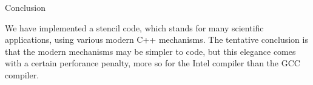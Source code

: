  {Conclusion}

We have implemented a stencil code, which stands for many scientific applications,
using various modern C++ mechanisms.
The tentative conclusion is that the modern mechanisms may be simpler to code,
but this elegance comes with a certain perforance penalty,
more so for the Intel compiler than the GCC compiler.

\endinput


First of all we remark that ranging over data:
\begin{multicols}{2}
\begin{lstlisting}
#pragma omp parallel for 
for ( int i=0; i<x.size(); ++i )
  x[i] = f(i);
\end{lstlisting}
\columnbreak
\begin{lstlisting}
#pragma omp parallel for 
for ( auto& [i,e] : 
        x | rv::enumerate )
  e = f(i);
\end{lstlisting}
\end{multicols}
comes with zero performance penalty.

There are also `execution policies' but at the high core counts common in HPC,
these can be dramatically worse than using OpenMP.


